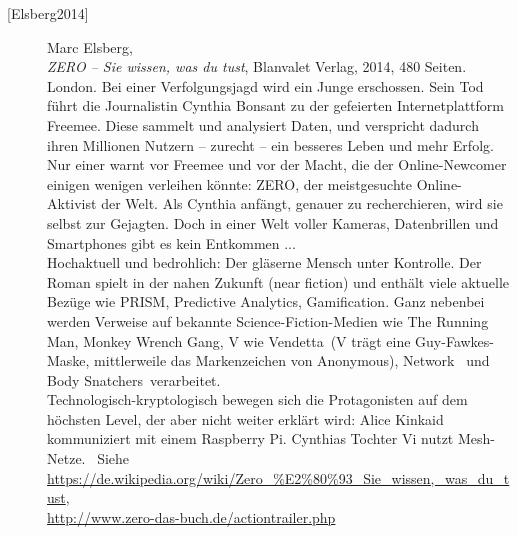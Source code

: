 \begin{description}




\item[\textrm{[Elsberg2014]}] 
    Marc Elsberg,\\
    {\em ZERO -- Sie wissen, was du tust}, Blanvalet Verlag, 2014, 480 Seiten.\\
    London. Bei einer Verfolgungsjagd wird ein Junge erschossen. Sein Tod führt die
    Journalistin Cynthia Bonsant zu der gefeierten Internetplattform Freemee. Diese
    sammelt und analysiert Daten, und verspricht dadurch ihren Millionen Nutzern
    -- zurecht -- ein besseres Leben und mehr Erfolg. Nur einer warnt vor Freemee
    und vor der Macht, die der Online-Newcomer einigen wenigen verleihen könnte:
    ZERO, der meistgesuchte Online-Aktivist der Welt. Als Cynthia anfängt, genauer
    zu recherchieren, wird sie selbst zur Gejagten. Doch in einer Welt voller Kameras,
    Datenbrillen und Smartphones gibt es kein Entkommen ...\\
    Hochaktuell und bedrohlich: Der gläserne Mensch unter Kontrolle.
    Der Roman spielt in der nahen Zukunft (near fiction) und
    enthält viele aktuelle Bezüge wie PRISM, Predictive Analytics, Gamification.
    Ganz nebenbei werden Verweise auf bekannte Science-Fiction-Medien wie
    \glqq The Running Man\grqq, \glqq Monkey Wrench Gang\grqq, \glqq V wie
    Vendetta\grqq~(V trägt eine Guy-Fawkes-Maske, mittlerweile das Markenzeichen
    von Anonymous), \glqq Network\grqq~ und \glqq Body Snatchers\grqq~verarbeitet.\\
    Technologisch-kryptologisch bewegen sich die Protagonisten auf dem höchsten
    Level, der aber nicht weiter erklärt wird: Alice Kinkaid kommuniziert mit einem
    Raspberry Pi. Cynthias Tochter Vi nutzt Mesh-Netze. ~Siehe\\
    \url{https://de.wikipedia.org/wiki/Zero_%E2%80%93_Sie_wissen,_was_du_tust},\\
    \url{http://www.zero-das-buch.de/actiontrailer.php}\\




\end{description}
